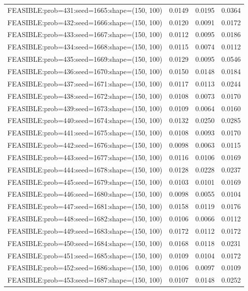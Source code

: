 \begin{longtable}{lccc}
FEASIBLE:prob=431:seed=1665:shape=(150, 100) &   0.0149 & 0.0195 & 0.0364 \\
FEASIBLE:prob=432:seed=1666:shape=(150, 100) &   0.0120 & 0.0091 & 0.0172 \\
FEASIBLE:prob=433:seed=1667:shape=(150, 100) &   0.0112 & 0.0095 & 0.0186 \\
FEASIBLE:prob=434:seed=1668:shape=(150, 100) &   0.0115 & 0.0074 & 0.0112 \\
FEASIBLE:prob=435:seed=1669:shape=(150, 100) &   0.0129 & 0.0095 & 0.0546 \\
FEASIBLE:prob=436:seed=1670:shape=(150, 100) &   0.0150 & 0.0148 & 0.0184 \\
FEASIBLE:prob=437:seed=1671:shape=(150, 100) &   0.0117 & 0.0113 & 0.0244 \\
FEASIBLE:prob=438:seed=1672:shape=(150, 100) &   0.0108 & 0.0073 & 0.0170 \\
FEASIBLE:prob=439:seed=1673:shape=(150, 100) &   0.0109 & 0.0064 & 0.0160 \\
FEASIBLE:prob=440:seed=1674:shape=(150, 100) &   0.0132 & 0.0250 & 0.0285 \\
FEASIBLE:prob=441:seed=1675:shape=(150, 100) &   0.0108 & 0.0093 & 0.0170 \\
FEASIBLE:prob=442:seed=1676:shape=(150, 100) &   0.0098 & 0.0063 & 0.0115 \\
FEASIBLE:prob=443:seed=1677:shape=(150, 100) &   0.0116 & 0.0106 & 0.0169 \\
FEASIBLE:prob=444:seed=1678:shape=(150, 100) &   0.0128 & 0.0228 & 0.0237 \\
FEASIBLE:prob=445:seed=1679:shape=(150, 100) &   0.0103 & 0.0101 & 0.0169 \\
FEASIBLE:prob=446:seed=1680:shape=(150, 100) &   0.0098 & 0.0055 & 0.0104 \\
FEASIBLE:prob=447:seed=1681:shape=(150, 100) &   0.0158 & 0.0119 & 0.0176 \\
FEASIBLE:prob=448:seed=1682:shape=(150, 100) &   0.0106 & 0.0066 & 0.0112 \\
FEASIBLE:prob=449:seed=1683:shape=(150, 100) &   0.0172 & 0.0112 & 0.0172 \\
FEASIBLE:prob=450:seed=1684:shape=(150, 100) &   0.0168 & 0.0118 & 0.0231 \\
FEASIBLE:prob=451:seed=1685:shape=(150, 100) &   0.0109 & 0.0104 & 0.0172 \\
FEASIBLE:prob=452:seed=1686:shape=(150, 100) &   0.0106 & 0.0097 & 0.0109 \\
FEASIBLE:prob=453:seed=1687:shape=(150, 100) &   0.0107 & 0.0148 & 0.0252 \\

\end{longtable}
